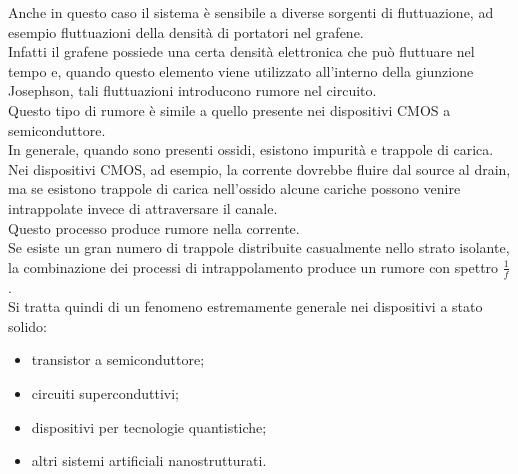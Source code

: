 Anche in questo caso il sistema è sensibile a diverse sorgenti di fluttuazione, ad esempio fluttuazioni della densità di portatori nel grafene.\\
Infatti il grafene possiede una certa densità elettronica che può fluttuare nel tempo e, quando questo elemento viene utilizzato all'interno della giunzione Josephson, tali fluttuazioni introducono rumore nel circuito.\\
Questo tipo di rumore è simile a quello presente nei dispositivi CMOS a semiconduttore.\\
In generale, quando sono presenti ossidi, esistono impurità e trappole di carica. Nei dispositivi CMOS, ad esempio, la corrente dovrebbe fluire dal source al drain, ma se esistono trappole di carica nell'ossido alcune cariche possono venire intrappolate invece di attraversare il canale.\\
Questo processo produce rumore nella corrente.\\
Se esiste un gran numero di trappole distribuite casualmente nello strato isolante, la combinazione dei processi di intrappolamento produce un rumore con spettro $\frac{1}{f}$.\\
Si tratta quindi di un fenomeno estremamente generale nei dispositivi a stato solido:
\begin{itemize}[leftmargin=0.5cm]
    \item transistor a semiconduttore;
    \item circuiti superconduttivi;
    \item dispositivi per tecnologie quantistiche;
    \item altri sistemi artificiali nanostrutturati.
\end{itemize}